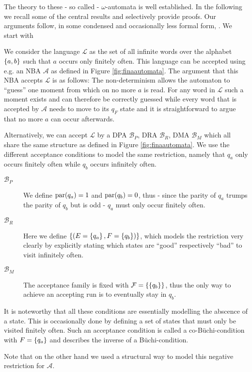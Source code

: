 The theory to these - so called - $\omega$-automata is well
established. In the following we recall some of the central results and 
selectively provide proofs. Our arguments follow, in some condensed and
occasionally less formal form, \cite[Chapter 1]{AutoLogInfGames}. We start with
\begin{example}
  We consider the language $\mathcal{L}$ as the set of all infinite
  words over the alphabet $\left\{a,b\right\}$ such that $a$ occurs only finitely often.
  This language can be accepted using e.g. an \ac{NBA} $\mathcal{A}$ as defined 
  in Figure \ref{fig:finaautomata}. The argument that this \ac{NBA} accepts
  $\mathcal{L}$ is as follows: The non-determinism allows the automaton to
  \enquote{guess} one moment from which on no more $a$ is read. For any word in 
  $\mathcal{L}$ such a moment exists and can therefore be correctly guessed
  while every word that is accepted by $\mathcal{A}$ needs to move to its
  $q_{F}$ state and it is straightforward to argue that no more $a$ can occur
  afterwards.

  Alternatively, we can accept $\mathcal{L}$ by a \ac{DPA} $\mathcal{B}_{P}$,
  \ac{DRA} $\mathcal{B}_{R}$, \ac{DMA}
  $\mathcal{B}_{M}$ which all share the same structure as defined in Figure
  \ref{fig:finaautomata}. We use the different acceptance conditions to model
  the same restriction, namely that $q_{a}$ only occurs finitely often while
  $q_{b}$ occurs infinitely often.
  \begin{description}
    \item [$\mathcal{B}_{P}$] We define $\operatorname{par}(q_{a}) = 1$ and
      $\operatorname{par}(q_{b}) = 0$, thus - since the parity of $q_{a}$ trumps the
      parity of $q_{b}$ but is odd - $q_{a}$ must only occur finitely often.
    \item [$\mathcal{B}_{R}$] Here we define $\left\{\left(E = \left\{q_{a}\right\},
      F = \left\{q_{b}\right\}\right)\right\}$, which models the restriction very clearly by
      explicitly stating which states are \enquote{good} respectively
      \enquote{bad} to visit infinitely often.
    \item [$\mathcal{B}_{M}$] The acceptance family is fixed with
      $\mathcal{F} = \left\{\left\{q_{b}\right\}\right\}$, thus the only way to achieve an
      accepting run is to eventually stay in $q_{b}$.
  \end{description}
  It is noteworthy that all these conditions are essentially modelling the
  abscence of a state. This is occasionally done by defining a set of states
  that must only be visited finitely often. Such an acceptance condition is
  called a co-Büchi-condition with $F = \left\{q_{a}\right\}$ and describes the inverse
  of a Büchi-condition.

  Note that on the other hand we used a structural way to model this negative
  restriction for $\mathcal{A}$.
  \label{ex:fina}
\end{example}
